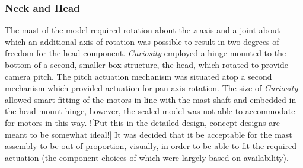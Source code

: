     \subsubsection{Neck and Head}
      The mast of the model required rotation about the $z$-axis and a joint about which an additional axis of rotation was possible to result in two degrees of freedom for the head component. \textit{Curiosity} employed a hinge mounted to the bottom of a second, smaller box structure, the head, which rotated to provide camera pitch. The pitch actuation mechanism was situated atop a second mechanism which provided actuation for pan-axis rotation. The size of \textit{Curiosity} allowed smart fitting of the motors in-line with the mast shaft and embedded in the head mount hinge, however, the scaled model was not able to accommodate for motors in this way. ![Put this in the detailed design, concept designs are meant to be somewhat ideal!] It was decided that it be acceptable for the mast assembly to be out of proportion, visually, in order to be able to fit the required actuation (the component choices of which were largely based on availability).
      
